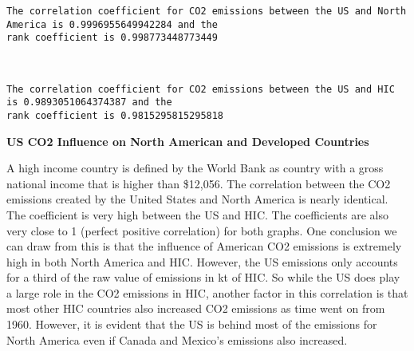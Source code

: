 \documentclass[11pt]{article}
\begin{document}
    \begin{Verbatim}[commandchars=\\\{\}]
The correlation coefficient for CO2 emissions between the US and North America is 0.9996955649942284 and the 
rank coefficient is 0.998773448773449

    \end{Verbatim}

    \begin{center}
    \end{center}
    { \hspace*{\fill} \\}
    
    \begin{Verbatim}[commandchars=\\\{\}]
The correlation coefficient for CO2 emissions between the US and HIC is 0.9893051064374387 and the 
rank coefficient is 0.9815295815295818

    \end{Verbatim}

    \textbf{US CO2 Influence on North American and Developed Countries}

A high income country is defined by the World Bank as country with a
gross national income that is higher than \$12,056. The correlation
between the CO2 emissions created by the United States and North America
is nearly identical. The coefficient is very high between the US and
HIC. The coefficients are also very close to 1 (perfect positive
correlation) for both graphs. One conclusion we can draw from this is
that the influence of American CO2 emissions is extremely high in both
North America and HIC. However, the US emissions only accounts for a
third of the raw value of emissions in kt of HIC. So while the US does
play a large role in the CO2 emissions in HIC, another factor in this
correlation is that most other HIC countries also increased CO2
emissions as time went on from 1960. However, it is evident that the US
is behind most of the emissions for North America even if Canada and
Mexico's emissions also increased.
\end{document}
